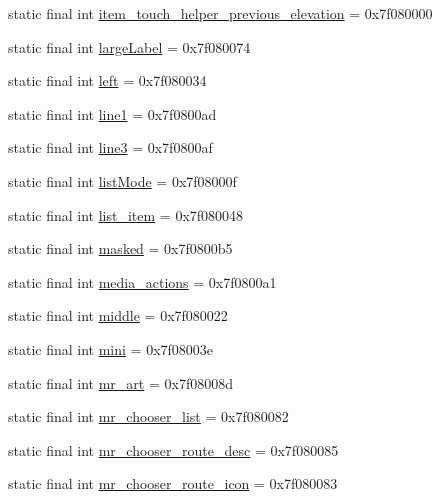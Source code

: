 \begin{CompactItemize}
\item 
static final int \hyperlink{classandroid_1_1support_1_1v4_1_1_r_1_1id_7c112d84703203b8c6b53e03eba9b291}{item\_\-touch\_\-helper\_\-previous\_\-elevation} = 0x7f080000
\item 
static final int \hyperlink{classandroid_1_1support_1_1v4_1_1_r_1_1id_5423fa18d4ed0e78623f4ed37b1b7598}{largeLabel} = 0x7f080074
\item 
static final int \hyperlink{classandroid_1_1support_1_1v4_1_1_r_1_1id_750384f18790153ca3b5e4a5b94b54a0}{left} = 0x7f080034
\item 
static final int \hyperlink{classandroid_1_1support_1_1v4_1_1_r_1_1id_f040cce627ceab9858bb65ec364629c6}{line1} = 0x7f0800ad
\item 
static final int \hyperlink{classandroid_1_1support_1_1v4_1_1_r_1_1id_0fc02efc0fcae9c312e1fa5989e0d631}{line3} = 0x7f0800af
\item 
static final int \hyperlink{classandroid_1_1support_1_1v4_1_1_r_1_1id_0825e55467393d83dd6ddb11b0f73679}{listMode} = 0x7f08000f
\item 
static final int \hyperlink{classandroid_1_1support_1_1v4_1_1_r_1_1id_609bfd2b5efcfd22b8593b55b2cc9d20}{list\_\-item} = 0x7f080048
\item 
static final int \hyperlink{classandroid_1_1support_1_1v4_1_1_r_1_1id_b25a5b68bb3d5e993ead7f13125a7aba}{masked} = 0x7f0800b5
\item 
static final int \hyperlink{classandroid_1_1support_1_1v4_1_1_r_1_1id_e32bffaf7813d029d69024bb57ebbab3}{media\_\-actions} = 0x7f0800a1
\item 
static final int \hyperlink{classandroid_1_1support_1_1v4_1_1_r_1_1id_e179375089fefcd27d6a05372a584e7f}{middle} = 0x7f080022
\item 
static final int \hyperlink{classandroid_1_1support_1_1v4_1_1_r_1_1id_73791de1a13cda31b7c8bc90f3f3fc97}{mini} = 0x7f08003e
\item 
static final int \hyperlink{classandroid_1_1support_1_1v4_1_1_r_1_1id_d20ac5c3195d2c1c594478d8b8390a84}{mr\_\-art} = 0x7f08008d
\item 
static final int \hyperlink{classandroid_1_1support_1_1v4_1_1_r_1_1id_6142159a3dcfd9761c68d0beed6dbbde}{mr\_\-chooser\_\-list} = 0x7f080082
\item 
static final int \hyperlink{classandroid_1_1support_1_1v4_1_1_r_1_1id_cfeb9c34b40d9b921602b566e3c23bd0}{mr\_\-chooser\_\-route\_\-desc} = 0x7f080085
\item 
static final int \hyperlink{classandroid_1_1support_1_1v4_1_1_r_1_1id_b45bd8df81cdc3218b6b3a883d535e2a}{mr\_\-chooser\_\-route\_\-icon} = 0x7f080083

\end{CompactItemize}
